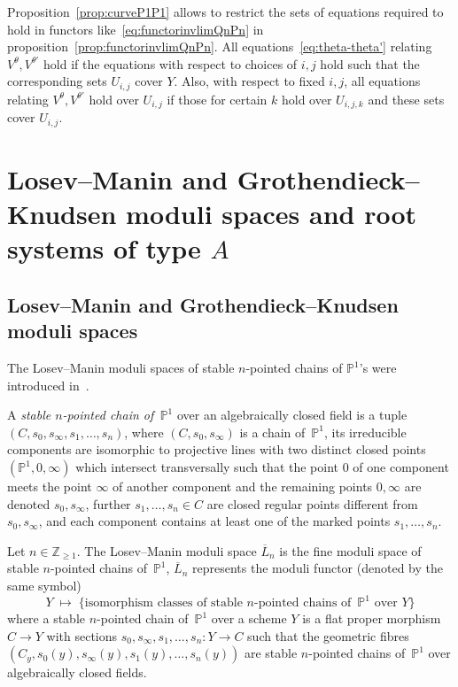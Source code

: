 \documentclass[ALCO,ThmDefs,Unicode,epreuves]{cedram}
\def\Z{\mathds Z}
\def\P{\mathds P}
\begin{document}
\begin{rema}\label{rem:restr-eq-theta-theta'}
Proposition~\ref{prop:curveP1P1} allows to restrict the sets of equations 
required to hold in functors like~\eqref{eq:functorinvlimQnPn} in 
proposition~\ref{prop:functorinvlimQnPn}.
All equations~\eqref{eq:theta-theta'} relating $V^\theta,V^{\theta'}$ hold 
if the equations with respect to choices of $i,j$ hold such that the corresponding sets 
$U_{i,j}$ cover $Y$.
Also, with respect to fixed $i,j$, all equations relating $V^\theta,V^{\theta'}$ 
hold over $U_{i,j}$ if those for certain $k$ hold over $U_{i,j,k}$
and these sets cover $U_{i,j}$.
\end{rema}



\section{Losev--Manin and Grothendieck--Knudsen moduli spaces and root systems of type \texorpdfstring{$A$}{A}}
\label{sec:Ln-M0n}

\subsection{Losev--Manin and Grothendieck--Knudsen moduli spaces}
\label{subsec:Ln-M0n}

The Losev--Manin moduli spaces of stable $n$-pointed chains of $\P^1$'s 
were introduced in~\cite{LM00}.

\begin{defi}
A {\it stable $n$-pointed chain of $\,\P^1\!$} over an algebraically closed 
field is a tuple $(C,s_0,s_\infty,s_1,\ldots,s_n)$, where $(C,s_0,s_\infty)$ 
is a chain of $\,\P^1\!$, \ie its irreducible components are isomorphic to 
projective lines with two distinct closed points $(\P^1,0,\infty)$ which
intersect transversally such that the point $0$ of one component 
meets the point $\infty$ of another component and the remaining points $0,\infty$
are denoted $s_0,s_\infty$, further $s_1,\ldots,s_n\in C$ are closed regular 
points different from $s_0,s_\infty$, and each component contains at least 
one of the marked points $s_1,\ldots,s_n$.
\end{defi}

\begin{defithm}[\cite{LM00}]
Let $n\in\Z_{\geq1}$. The Losev--Manin moduli space $\overline{L}_n$ is 
the fine moduli space of stable $n$-pointed chains of $\,\P^1\!$, 
\ie $\overline{L}_n$ represents the moduli functor (denoted by the same symbol)
\[ 
Y\;\mapsto\;
\Big\{\text{isomorphism classes of stable $n$-pointed chains of $\,\P^1\!$ over $Y$}\Big\}
\]
where a stable $n$-pointed chain of $\,\P^1$ over a scheme $Y$ is a flat
proper morphism
$C\to Y$ with sections $s_0,s_\infty,s_1,\ldots,s_n\colon Y\to C$ 
such that the geometric fibres
$(C_y,s_0(y),s_\infty(y),s_1(y),\ldots,s_n(y))$ 
are stable $n$-pointed chains of $\,\P^1\!$ over algebraically
closed fields.
\end{defithm}
\end{document}
